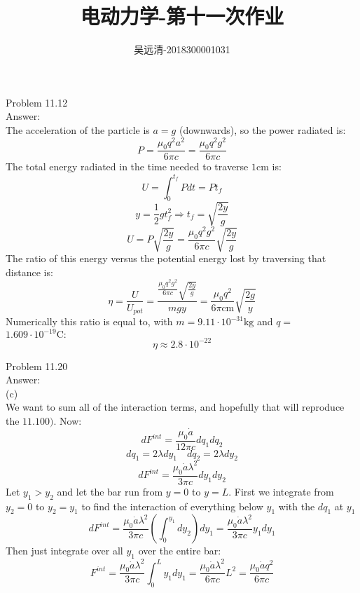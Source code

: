 \documentclass[UTF8]{ctexart}
\title{电动力学-第十一次作业}
\author{吴远清-2018300001031}
\begin{document}
	\maketitle
	Problem 11.12\\
	Answer:\\
	The acceleration of the particle is $a=g$ (downwards), so the power radiated is:
	$$P=\frac{\mu_{0} q^{2} a^{2}}{6 \pi c}=\frac{\mu_{0} q^{2} g^{2}}{6 \pi c}$$
	The total energy radiated in the time needed to traverse $1 \mathrm{cm}$ is:
	$$U=\int_{0}^{t_{f}} P d t=P t_{f}$$
	$$y=\frac{1}{2} g t_{f}^{2} \Longrightarrow t_{f}=\sqrt{\frac{2 y}{g}}$$
	$$U=P \sqrt{\frac{2 y}{g}}=\frac{\mu_{0} q^{2} g^{2}}{6 \pi c} \sqrt{\frac{2 y}{g}}$$
	The ratio of this energy versus the potential energy lost by traversing that distance is:
	$$\eta=\frac{U}{U_{p o t}}=\frac{\frac{\mu_{0} q^{2} g^{2}}{6 \pi c} \sqrt{\frac{2 y}{g}}}{m g y}=\frac{\mu_{0} q^{2}}{6 \pi \mathrm{cm}} \sqrt{\frac{2 g}{y}}$$
	Numerically this ratio is equal to, with $m=9.11 \cdot 10^{-31} \mathrm{kg}$ and $q=$ $1.609 \cdot 10^{-19} \mathrm{C}:$
	$$\eta \approx 2.8 \cdot 10^{-22}$$
	
	Problem 11.20\\
	Answer:\\
	(c)\\
	We want to sum all of the interaction terms, and hopefully that will reproduce the $11.100) .$ Now:
	$$d F^{i n t}=\frac{\mu_{0} \dot{a}}{12 \pi c} d q_{1} d q_{2}$$
	$$d q_{1}=2 \lambda d y_{1} \quad d q_{2}=2 \lambda d y_{2}$$
	$$d F^{i n t}=\frac{\mu_{0} \dot{a} \lambda^{2}}{3 \pi c} d y_{1} d y_{2}$$
	Let $y_{1}>y_{2}$ and let the bar run from $y=0$ to $y=L$. First we integrate from $y_{2}=0$ to $y_{2}=y_{1}$ to find the interaction of everything below $y_{1}$ with the $d q_{1}$ at $y_{1}$
	$$d F^{i n t}=\frac{\mu_{0} \dot{a} \lambda^{2}}{3 \pi c}\left(\int_{0}^{y_{1}} d y_{2}\right) d y_{1}=\frac{\mu_{0} \dot{a} \lambda^{2}}{3 \pi c} y_{1} d y_{1}$$
	Then just integrate over all $y_{1}$ over the entire bar:
	$$F^{i n t}=\frac{\mu_{0} \dot{a} \lambda^{2}}{3 \pi c} \int_{0}^{L} y_{1} d y_{1}=\frac{\mu_{0} \dot{a} \lambda^{2}}{6 \pi c} L^{2}=\frac{\mu_{0} \dot{a} q^{2}}{6 \pi c}$$
	
\end{document}
